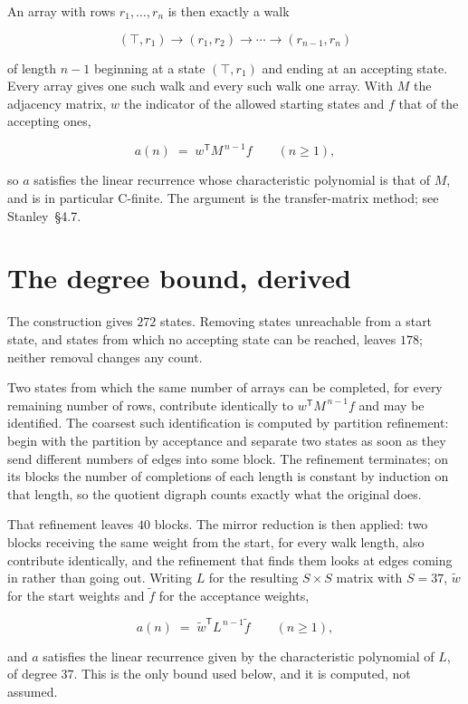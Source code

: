 \documentclass[11pt]{article}
\theoremstyle{definition}
\begin{document}
An array with rows $r_1,\dots,r_n$ is then exactly a walk

\[(\top,r_1) \to (r_1,r_2) \to \cdots \to (r_{n-1},r_n)\]

of length $n-1$ beginning at a state $(\top,r_1)$ and ending at an accepting state. Every array gives one such walk and every such walk one array. With $M$ the adjacency matrix, $w$ the indicator of the allowed starting states and $f$ that of the accepting ones,

\[a(n) \;=\; w^{\mathsf T} M^{\,n-1} f \qquad (n \ge 1),\]

so $a$ satisfies the linear recurrence whose characteristic polynomial is that of $M$, and is in particular C-finite. The argument is the transfer-matrix method; see Stanley~\S4.7.

\section{The degree bound, derived}

The construction gives $272$ states. Removing states unreachable from a start state, and states from which no accepting state can be reached, leaves $178$; neither removal changes any count.

Two states from which the same number of arrays can be completed, for every remaining number of rows, contribute identically to $w^{\mathsf T}M^{\,n-1}f$ and may be identified. The coarsest such identification is computed by partition refinement: begin with the partition by acceptance and separate two states as soon as they send different numbers of edges into some block. The refinement terminates; on its blocks the number of completions of each length is constant by induction on that length, so the quotient digraph counts exactly what the original does.

That refinement leaves $40$ blocks. The mirror reduction is then applied: two blocks receiving the same weight from the start, for every walk length, also contribute identically, and the refinement that finds them looks at edges coming in rather than going out. Writing $L$ for the resulting $S \times S$ matrix with $S = 37$, $\tilde w$ for the start weights and $\tilde f$ for the acceptance weights,

\[a(n) \;=\; \tilde w^{\mathsf T} L^{\,n-1} \tilde f \qquad (n \ge 1),\]

and $a$ satisfies the linear recurrence given by the characteristic polynomial of $L$, of degree $37$. This is the only bound used below, and it is computed, not assumed.
\end{document}
